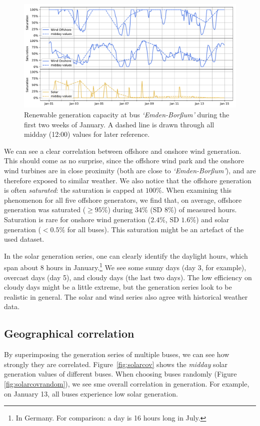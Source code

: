 \documentclass[main.tex]{subfiles}
\begin{document}
\begin{figure}[ht]
    \centering
    \includegraphics[width=\textwidth]{img/genseries270jan.pdf}
    \caption{Renewable generation capacity at bus \emph{`Emden-Borßum'} during the first two weeks of January. A dashed line is drawn through all midday (12:00) values for later reference.}\label{fig:genseries270jan}
\end{figure}

We can see a clear correlation between offshore and onshore wind generation. This should come as no surprise, since the offshore wind park and the onshore wind turbines are in close proximity (both are close to \emph{`Emden-Borßum'}), and are therefore exposed to similar weather. We also notice that the offshore generation is often \emph{saturated}: the saturation is capped at $100\si{\percent}$. When examining this phenomenon for all five offshore generators, we find that, on average, offshore generation was saturated ($\geq 95 \si{\percent}$) during $34\si{\percent}$ (SD $8\si{\percent}$) of measured hours. Saturation is rare for onshore wind generation ($2.4\si{\percent}$, SD $1.6\si{\percent}$) and solar generation ($< 0.5\si{\percent}$ for all buses). This saturation might be an artefact of the used dataset.

In the solar generation series, one can clearly identify the daylight hours, which span about 8 hours in January.\footnote{In Germany. For comparison: a day is 16 hours long in July.} We see some sunny days (day 3, for example), overcast days (day 5), and cloudy days (the last two days). The low efficiency on cloudy days might be a little extreme, but the generation series look to be realistic in general. The solar and wind series also agree with historical weather data.

\subsection{Geographical correlation}
By superimposing the generation series of multiple buses, we can see how strongly they are correlated. Figure~\ref{fig:solarcov} shows the \emph{midday} solar generation values of different buses. When choosing buses randomly (Figure \ref{fig:solarcovrandom}), we see sme overall correlation in generation. For example, on January 13, all buses experience low solar generation. 
\end{document}

